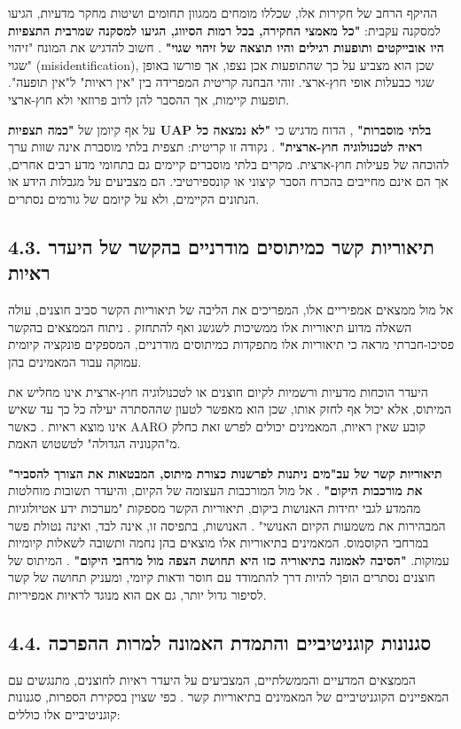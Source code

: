 \documentclass[12pt,a4paper]{article}
\begin{document}
ההיקף הרחב של חקירות אלו, שכללו מומחים ממגוון תחומים ושיטות מחקר מדעיות, הגיעו למסקנה עקבית: \textbf{"כל מאמצי החקירה, בכל רמות הסיווג, הגיעו למסקנה שמרבית התצפיות היו אובייקטים ותופעות רגילים והיו תוצאה של זיהוי שגוי"} \cite{2, 6}. חשוב להדגיש את המונח "זיהוי שגוי" (misidentification), שכן הוא מצביע על כך שהתופעות אכן נצפו, אך פורשו באופן שגוי כבעלות אופי חוץ-ארצי. זוהי הבחנה קריטית המפרידה בין "אין ראיות" ל"אין תופעה". תופעות קיימות, אך ההסבר להן לרוב פרוזאי ולא חוץ-ארצי.

על אף קיומן של \textbf{"כמה תצפיות UAP בלתי מוסברות"} \cite{2, 6}, הדוח מדגיש כי \textbf{"לא נמצאה כל ראיה לטכנולוגיה חוץ-ארצית"} \cite{2, 6}. נקודה זו קריטית: תצפית בלתי מוסברת אינה שוות ערך להוכחה של פעילות חוץ-ארצית. מקרים בלתי מוסברים קיימים גם בתחומי מדע רבים אחרים, אך הם אינם מחייבים בהכרח הסבר קיצוני או קונספירטיבי. הם מצביעים על מגבלות הידע או הנתונים הקיימים, ולא על קיומם של גורמים נסתרים.

\subsection{4.3. תיאוריות קשר כמיתוסים מודרניים בהקשר של היעדר ראיות}
אל מול ממצאים אמפיריים אלו, המפריכים את הליבה של תיאוריות הקשר סביב חוצנים, עולה השאלה מדוע תיאוריות אלו ממשיכות לשגשג ואף להתחזק \cite{3, 4}. ניתוח הממצאים בהקשר פסיכו-חברתי מראה כי תיאוריות אלו מתפקדות כמיתוסים מודרניים, המספקים פונקציה קיומית עמוקה עבור המאמינים בהן.

היעדר הוכחות מדעיות ורשמיות לקיום חוצנים או לטכנולוגיה חוץ-ארצית אינו מחליש את המיתוס, אלא יכול אף לחזק אותו, שכן הוא מאפשר לטעון שההסתרה יעילה כל כך עד שאיש אינו מוצא ראיות \cite{3, 4}. כאשר AARO קובע שאין ראיות, המאמינים יכולים לפרש זאת כחלק מ"הקנוניה הגדולה" לטשטוש האמת.

\textbf{"תיאוריות קשר של עב"מים ניתנות לפרשנות כצורת מיתוס, המבטאות את הצורך להסביר את מורכבות היקום"} \cite{3}. אל מול המורכבות העצומה של הקיום, והיעדר תשובות מוחלטות מהמדע לגבי יחידות האנושות ביקום, תיאוריות הקשר מספקות "מערכות ידע אטיולוגיות המבהירות את משמעות הקיום האנושי" \cite{3}. האנושות, בתפיסה זו, אינה לבד, ואינה נטולת פשר במרחבי הקוסמוס. המאמינים בתיאוריות אלו מוצאים בהן נחמה ותשובה לשאלות קיומיות עמוקות. \textbf{"הסיבה לאמונה בתיאוריה כזו היא תחושת הצפה מול מרחבי היקום"} \cite{3}. המיתוס של חוצנים נסתרים הופך להיות דרך להתמודד עם חוסר ודאות קיומי, ומעניק תחושה של קשר לסיפור גדול יותר, גם אם הוא מנוגד לראיות אמפיריות.

\subsection{4.4. סגנונות קוגניטיביים והתמדת האמונה למרות ההפרכה}
הממצאים המדעיים והממשלתיים, המצביעים על היעדר ראיות לחוצנים, מתנגשים עם המאפיינים הקוגניטיביים של המאמינים בתיאוריות קשר \cite{4}. כפי שצוין בסקירת הספרות, סגנונות קוגניטיביים אלו כוללים:
\end{document}
